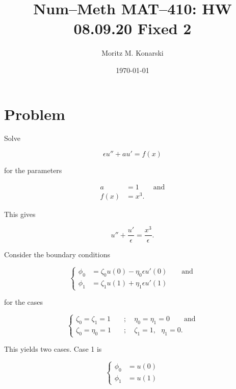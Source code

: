 \documentclass[a4paper, 12pt, reqno]{amsart}
\title{Num--Meth MAT--410: HW 08.09.20 Fixed 2}
\author{Moritz M. Konarski}
\date{\today}
\numberwithin{equation}{section}
\begin{document}
\maketitle

\section{Problem}

Solve 

\begin{equation}\nonumber
    \epsilon u'' + a u' = f(x)
\end{equation}

for the parameters

\begin{equation}\nonumber
    \begin{aligned}
        a &= 1 \qquad \text{and} \\
        f(x) &= x^3.
    \end{aligned}
\end{equation}

This gives

\begin{equation}\label{eq:01}
    u'' + \frac{u'}{\epsilon} = \frac{x^3}{\epsilon}.
\end{equation}

Consider the boundary conditions

\begin{equation}\nonumber
    \begin{cases}
        \phi_0 &= \zeta_0 u(0) - \eta_0 \epsilon u'(0) \qquad \text{and} \\
        \phi_1 &= \zeta_1 u(1) + \eta_1 \epsilon u'(1)
    \end{cases}
\end{equation}

for the cases 

\begin{equation}\nonumber
    \begin{cases}
        \zeta_0 = \zeta_1 = 1 \quad&; \quad \eta_0 = \eta_1 = 0 \qquad
        \text{and} \\
        \zeta_0 = \eta_0 = 1 \quad&; \quad \zeta_1 = 1, \text{ }\eta_1 = 0.
    \end{cases}
\end{equation}

This yields two cases. Case 1 is

\begin{equation}\label{eq:bvp1}
    \begin{cases}
        \phi_0 &= u(0) \\
        \phi_1 &= u(1)
    \end{cases}
\end{equation}
\end{document}
